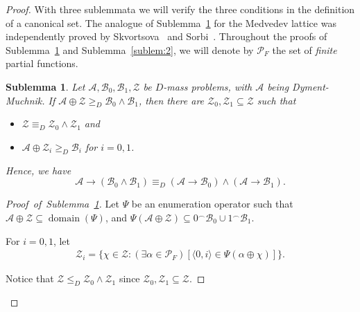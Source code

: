 \documentclass[11pt]{amsart}
\newtheorem{sublemma}{Sublemma}
\DeclareMathOperator{\dom}{domain}
\newcommand{\smf}{\smallfrown}
\newcommand{\imp}{\rightarrow}
\newcommand{\meet}{\wedge}
\newcommand{\andd}{\wedge}
\newcommand{\MP}[1]{\ensuremath{\mathcal{#1}}}
\begin{document}
\begin{proof}
With three sublemmata we will verify the three conditions in the definition 
of a canonical set. The analogue of Sublemma~\ref{sublem:1} for the Medvedev 
lattice was independently proved by Skvortsova~\cite{Skvortsova:intuitionism} 
and Sorbi~\cite{Sorbi:Embedding}. Throughout the proofs of 
Sublemma~\ref{sublem:1} and Sublemma~\ref{sublem:2}, we will denote by 
$\mathcal{P}_F$ the set of \emph{finite} partial functions. 

\begin{sublemma}\label{sublem:1}
Let $\MP A, \MP{B}_0, \MP{B}_1, \MP Z$ be $D$-mass problems, with $\MP A$ 
being Dyment-Muchnik. If $\MP A \oplus \MP Z \geq_D \MP{B}_0 \meet \MP{B}_1$, 
then there are $\MP{Z}_0, \MP{Z}_1 \subseteq \MP Z $ such that 
\begin{itemize}
\item $\MP Z \equiv_D \MP{Z}_0 \meet \MP{Z}_1$ and
\item $\MP A \oplus \MP{Z}_i \geq_D \MP{B}_i$ for $i = 0,1$.
\end{itemize}
Hence, we have 
\[
\MP A \imp (\MP{B}_0 \meet \MP{B}_1) \equiv_D (\MP A \imp \MP{B}_0)
                     \meet (\MP A \imp \MP{B}_1).
\]
\end{sublemma}

\begin{proof}[Proof~of~Sublemma~\ref{sublem:1}] 
Let $\Psi$ be an enumeration operator such that $\MP A \oplus \MP Z \subseteq 
\dom(\Psi)$, and $\Psi(\MP A \oplus \MP Z) \subseteq 0^\smf \MP{B}_0 \cup 
1^\smf \MP{B}_1$.  

For $i = 0,1$, let
\begin{align*}
\MP{Z}_i = \{\chi \in \MP{Z} : (\exists \alpha \in \MP{P}_F)[\langle 0, i 
\rangle \in \Psi(\alpha \oplus \chi)]\}.
\end{align*}

Notice that $\MP{Z} \leq_D \MP{Z}_0 \andd \MP{Z}_1$ since $\MP{Z}_0, \MP{Z}_1 
\subseteq \MP Z$. 


\end{proof}
\end{proof}
\end{document}
